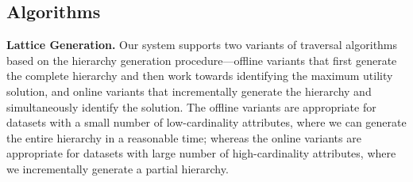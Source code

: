 \subsection{Algorithms\label{sec:algorithms}}
\textbf{Lattice Generation.} Our system supports two variants of traversal algorithms based on the hierarchy generation procedure---offline variants that first generate the complete hierarchy and then work towards identifying the maximum utility solution, and online variants that incrementally generate the hierarchy and simultaneously identify the solution. The offline variants are appropriate for datasets with a small number of low-cardinality attributes, where we can generate the entire hierarchy in a reasonable time; whereas the online variants are appropriate for datasets with large number of high-cardinality attributes, where we incrementally generate a partial hierarchy.



